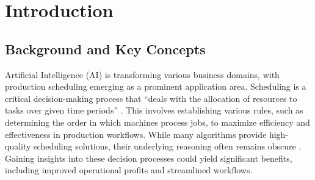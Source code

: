 \section{Introduction}

\subsection{Background and Key Concepts}
Artificial Intelligence (AI) is transforming various business domains, with production scheduling emerging as a prominent application area. Scheduling is a critical decision-making process that “deals with the allocation of resources to tasks over given time periods” . This involves establishing various rules, such as determining the order in which machines process jobs, to maximize efficiency and effectiveness in production workflows. While many algorithms provide high-quality scheduling solutions, their underlying reasoning often remains obscure . Gaining insights into these decision processes could yield significant benefits, including improved operational profits and streamlined workflows.


